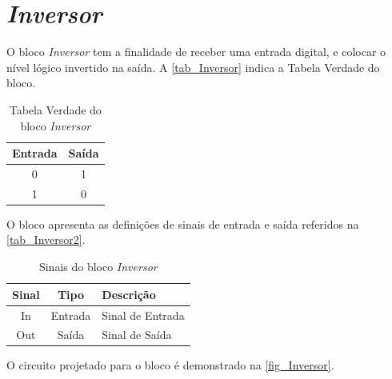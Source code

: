 \renewcommand{\NomeBloco}{\emph{Inversor}}
\renewcommand{\NomeBlocoNoIt}{Inversor}
\renewcommand{\NomePTab}{tab_\NomeBlocoNoIt}
\renewcommand{\NomeSTab}{tab_\NomeBlocoNoIt2}
\renewcommand{\NomePFig}{fig_\NomeBlocoNoIt}
\renewcommand{\NomeSFig}{fig_\NomeBlocoNoIt2}
\renewcommand{\NomeTTab}{tab_\NomeBlocoNoIt3}

\section{\NomeBloco}
\label{inversor1}

O bloco \NomeBloco{} tem a finalidade de receber uma entrada digital, e colocar o n\'ivel l\'ogico invertido na sa\'ida. A \autoref{\NomePTab} indica a Tabela Verdade do bloco.

\begin{table}[htbp]

\caption{Tabela Verdade do bloco \NomeBloco}%
\label{\NomePTab}
\centering
\begin{tabular}{cc}
    \toprule
    Entrada & Saída \\
    \midrule \midrule
    0 & 1 \\
    \midrule
    1 & 0 \\
\bottomrule

\end{tabular}
\end{table}

O bloco apresenta as defini{\c c}\~oes de sinais de entrada e sa\'ida referidos na \autoref{\NomeSTab}.

\begin{table}[htbp]
\caption{Sinais do bloco \NomeBloco}
\label{\NomeSTab}
\centering
\begin{tabular}{ccl}

    \toprule
    Sinal & Tipo    & Descri{\c c}\~ao        \\
    \midrule \midrule
    In    & Entrada & Sinal de Entrada \\
    \midrule
    Out   & Saída   & Sinal de Sa\'ida   \\
    \bottomrule
\end{tabular}
\end{table}

O circuito projetado para o bloco \'e demonstrado na \autoref{\NomePFig}.

